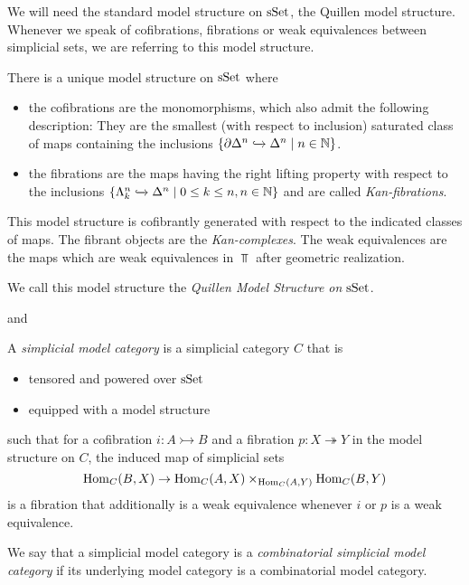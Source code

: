 We will need the standard model structure on $\operatorname{sSet}$, the Quillen model structure. 
Whenever we speak of cofibrations, fibrations or weak equivalences between simplicial sets, we are referring to this model structure.
\begin{thm}\label{thm:quillenModelSSet}
    There is a unique model structure on $\operatorname{sSet}$ where 
    \begin{itemize}
        \item the cofibrations are the monomorphisms, which also admit the following description: 
        They are the smallest (with respect to inclusion) saturated class of maps containing the inclusions $\left\lbrace\partial\Delta^n\xhookrightarrow{}\Delta^n\mid n\in\mathbb{N}\right\rbrace$.
        \item the fibrations are the maps having the right lifting property with respect to the inclusions $\left\lbrace\Lambda_k^n\xhookrightarrow{}\Delta^n\mid 0\leq k\leq n, n\in\mathbb{N}\right\rbrace$ and are called \emph{Kan-fibrations}.
    \end{itemize}
    This model structure is cofibrantly generated with respect to the indicated classes of maps.
    The fibrant objects are the \emph{Kan-complexes}.
    The weak equivalences are the maps which are weak equivalences in $\Top$ after geometric realization.

    We call this model structure the \emph{Quillen Model Structure on $\operatorname{sSet}$}.
    \begin{reference}
        \cite[Theorem 3.1.8 and Theorem 3.1.29]{cisinski_2019} and \cite[Chap. II, \S 3, Theorem 1]{Quillen1967}
    \end{reference}
\end{thm}
\begin{definition}
    A \emph{simplicial model category} is a simplicial category $C$ that is 
    \begin{itemize}
        \item tensored and powered over $\operatorname{sSet}$
        \item equipped with a model structure
    \end{itemize} 
    such that for a cofibration $i\colon A\rightarrowtail B$ and a fibration $p\colon X\twoheadrightarrow Y$ in the model structure on $C$, the induced map of simplicial sets
    \begin{equation*}
        \operatorname{Hom}_C(B,X)\to\operatorname{Hom}_C(A,X)\times_{\operatorname{Hom}_C(A,Y)}\operatorname{Hom}_C(B,Y)
    \end{equation*}
    is a fibration that additionally is a weak equivalence whenever $i$ or $p$ is a weak equivalence.
    
    We say that a simplicial model category is a \emph{combinatorial simplicial model category} if its underlying model category is a combinatorial model category.
\end{definition}
